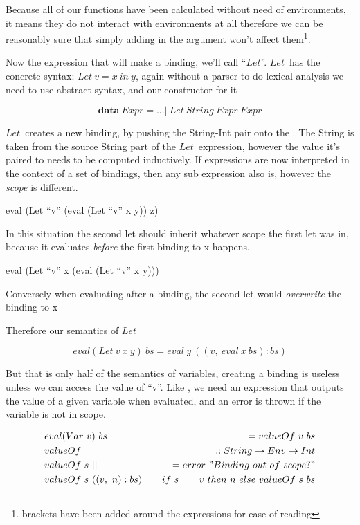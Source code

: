 \documentclass {article}
\begin{document}
Because all of our functions
have been calculated without need of environments,
it means they do not interact with environments at all
therefore we can be reasonably sure that simply adding in the
\env argument won't affect them\footnote{
brackets have been added around the expressions for ease of reading}.

\newcommand{\lets}{$Let$}

Now the expression that will make a binding,
we'll call ``\lets''.
\lets\ has the concrete syntax:
\( Let\ v = x\ in\ y\),
again without a parser to do
lexical analysis we need to use
abstract syntax, and our constructor
for it

	\[ \textbf{data} \ Expr = ... |\ Let \ String \ Expr \ Expr \]

\lets\ creates a new binding,
by pushing the String-Int pair
onto the \env.
The String is taken from the source
String part of the \lets\ expression,
however the value it's paired to 
needs to be computed inductively.
If expressions are now interpreted in
the context of a set of bindings, then
any sub expression also is,
however the \emph{scope} is different.

eval (Let ``v'' (eval (Let ``v'' x y)) z)
	
In this situation 
the second let should inherit
whatever scope the first let
was in, because it evaluates
\emph{before} the first binding
to x happens.

eval (Let ``v'' x (eval (Let ``v'' x y)))

Conversely when evaluating after
a binding, the second let would
\emph{overwrite} the binding to x

Therefore our semantics of \lets\

	\[eval(Let\ v\ x\ y)\ bs = eval\ y\ ((v,\ eval\ x\ bs):bs) \]

But that is only half of the semantics of variables,
creating a binding is useless unless
we can access the value of ``v''.
Like \val, we need an expression that
outputs the value of a given
variable when evaluated, 
and an error is thrown if the
variable is not in scope.

\begin{eqnarray*}
	&eval(Var\ v )\ bs &= valueOf\ v\ bs \\	
	&valueOf\ &:: String \rightarrow Env \rightarrow Int \\
	&valueOf\ s\ []\ &= error\ "Binding\ out\ of\ scope?" \\
	&valueOf\ s\ ((v,\ n):bs) &= if\ s == v\ then\ n\ else\ valueOf\ s\ bs 
\end{eqnarray*}
\end{document}
